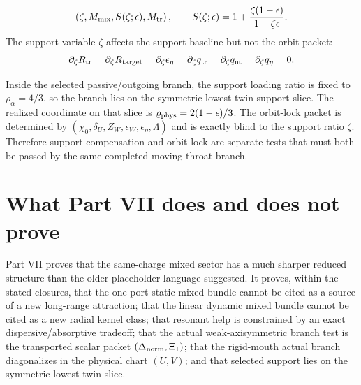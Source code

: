 \begin{equation}
\label{eq:part07-stage242-support-packet}
\left(\zeta,
M_{\rm mix},
S(\zeta;\epsilon),
M_{\rm tr}
\right),
\qquad
S(\zeta;\epsilon)=1+\frac{\zeta(1-\epsilon)}{1-\zeta\epsilon}.
\end{equation}
The support variable \(\zeta\) affects the support baseline but not the orbit packet:
\begin{equation}
\label{eq:part07-zeta-orbit-blind}
\partial_\zeta R_{\rm tr}
=
\partial_\zeta R_{\rm target}
=
\partial_\zeta\epsilon_\eta
=
\partial_\zeta q_{\rm tr}
=
\partial_\zeta q_{\rm nt}
=
\partial_\zeta q_\eta
=0.
\end{equation}

\begin{theorem}
\label{thm:part07-selected-twin-placement}
Inside the selected passive/outgoing branch, the support loading ratio is fixed to \(\rho_\alpha=4/3\), so the branch lies on the symmetric lowest-twin support slice.  The realized coordinate on that slice is \(\varrho_{\rm phys}=2(1-\epsilon)/3\).  The orbit-lock packet is determined by \((\chi_0,\delta_U,Z_W,\epsilon_W,\epsilon_\eta,\Lambda)\) and is exactly blind to the support ratio \(\zeta\).  Therefore support compensation and orbit lock are separate tests that must both be passed by the same completed moving-throat branch.
\end{theorem}


\section{What Part VII does and does not prove}
\label{sec:part07-what-it-does-not-prove}

Part VII proves that the same-charge mixed sector has a much sharper reduced structure than the older placeholder language suggested.  It proves, within the stated closures, that the one-port static mixed bundle cannot be cited as a source of a new long-range attraction; that the linear dynamic mixed bundle cannot be cited as a new radial kernel class; that resonant help is constrained by an exact dispersive/absorptive tradeoff; that the actual weak-axisymmetric branch test is the transported scalar packet \((\Delta_{\rm norm},\Xi_1)\); that the rigid-mouth actual branch diagonalizes in the physical chart \((U,V)\); and that selected support lies on the symmetric lowest-twin slice.

